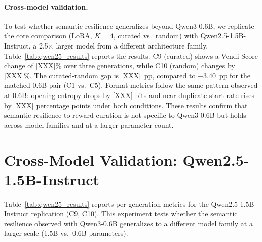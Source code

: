 

\paragraph{Cross-model validation.}
To test whether semantic resilience generalizes beyond Qwen3-0.6B, we replicate the core comparison (LoRA, $K{=}4$, curated vs.\ random) with Qwen2.5-1.5B-Instruct, a 2.5$\times$ larger model from a different architecture family. Table~\ref{tab:qwen25_results} reports the results. C9 (curated) shows a Vendi Score change of [XXX]\% over three generations, while C10 (random) changes by [XXX]\%. The curated-random gap is [XXX]~pp, compared to $-$3.40~pp for the matched 0.6B pair (C1 vs.\ C5). Format metrics follow the same pattern observed at 0.6B: opening entropy drops by [XXX] bits and near-duplicate start rate rises by [XXX] percentage points under both conditions. These results confirm that semantic resilience to reward curation is not specific to Qwen3-0.6B but holds across model families and at a larger parameter count.



\section{Cross-Model Validation: Qwen2.5-1.5B-Instruct}
\label{app:qwen25}

Table~\ref{tab:qwen25_results} reports per-generation metrics for the Qwen2.5-1.5B-Instruct replication (C9, C10). This experiment tests whether the semantic resilience observed with Qwen3-0.6B generalizes to a different model family at a larger scale (1.5B vs.\ 0.6B parameters).

